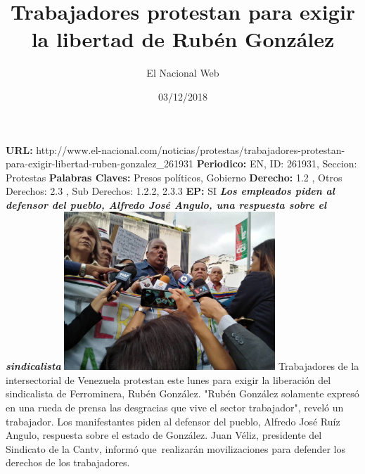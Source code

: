 \documentclass{article}%
\title{\textbf{Trabajadores protestan para exigir la libertad de Rubén González}}%
\author{El Nacional Web}%
\date{03/12/2018}%
\begin{document}
%
\normalsize%
\maketitle%
\textbf{URL: }%
http://www.el{-}nacional.com/noticias/protestas/trabajadores{-}protestan{-}para{-}exigir{-}libertad{-}ruben{-}gonzalez\_261931\newline%
%
\textbf{Periodico: }%
EN, %
ID: %
261931, %
Seccion: %
Protestas\newline%
%
\textbf{Palabras Claves: }%
Presos políticos, Gobierno\newline%
%
\textbf{Derecho: }%
1.2%
, Otros Derechos: %
2.3%
, Sub Derechos: %
1.2.2, 2.3.3%
\newline%
%
\textbf{EP: }%
SI\newline%
\newline%
%
\textbf{\textit{Los empleados piden al defensor del pueblo, Alfredo José Angulo, una respuesta sobre el sindicalista}}%
\newline%
\newline%
%
\includegraphics[width=300px]{207.jpg}%
\newline%
%
Trabajadores de la intersectorial de Venezuela protestan este lunes para exigir la liberación del sindicalista de Ferrominera, Rubén González.%
\newline%
%
"Rubén González solamente expresó en una rueda de prensa las desgracias que vive el sector trabajador", reveló un trabajador.%
\newline%
%
Los manifestantes piden al defensor del pueblo, Alfredo José Ruíz Angulo, respuesta sobre el estado de González.%
\newline%
%
Juan Véliz, presidente del Sindicato de la Cantv, informó que~realizarán movilizaciones para defender los derechos de los trabajadores.%
\newline%
%
\end{document}
